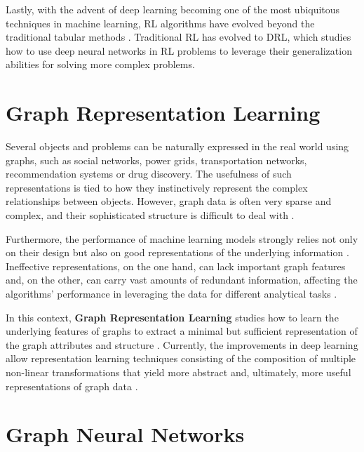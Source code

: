 Lastly, with the advent of deep learning becoming one of the most ubiquitous techniques in machine learning, \ac{RL} algorithms have evolved beyond the traditional tabular methods \cite{moralesGrokkingDeepReinforcement2020}. Traditional \ac{RL} has evolved to \ac{DRL}, which studies how to use deep neural networks in \ac{RL} problems to leverage their generalization abilities for solving more complex problems.

\section{Graph Representation Learning} \label{sec:g-rep-l}

Several objects and problems can be naturally expressed in the real world using graphs, such as social networks, power grids, transportation networks, recommendation systems or drug discovery. The usefulness of such representations is tied to how they instinctively represent the complex relationships between objects. However, graph data is often very sparse and complex, and their sophisticated structure is difficult to deal with \cite{liuIntroductionGraphNeural2020, zhaoRepresentationLearning2022}. \par

Furthermore, the performance of machine learning models strongly relies not only on their design but also on good representations of the underlying information \cite{liuIntroductionGraphNeural2020}.  Ineffective representations, on the one hand, can lack important graph features and, on the other, can carry vast amounts of redundant information, affecting the algorithms' performance in leveraging the data for different analytical tasks \cite{liuIntroductionGraphNeural2020, wuGraphNeuralNetworks2022}. \par

In this context, \textbf{Graph Representation Learning} studies how to learn the underlying features of graphs to extract a minimal but sufficient representation of the graph attributes and structure \cite{hamiltonGraphRepresentationLearning, zhaoRepresentationLearning2022, cuiGraphRepresentationLearning2022}. Currently, the improvements in deep learning allow representation learning techniques consisting of the composition of multiple non-linear transformations that yield more abstract and, ultimately, more useful representations of graph data \cite{cuiGraphRepresentationLearning2022}. 

\section{Graph Neural Networks} \label{sec:gnn}
 
